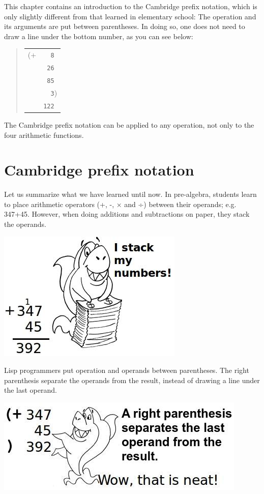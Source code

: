\documentclass[a4paper,12pt]{book}
\begin{document}
This chapter contains an introduction to
the Cambridge prefix notation, 
which is only slightly different from that
learned in elementary school: The operation
and its arguments are put between parentheses.
In doing so, one does not need to draw a line
under the bottom number, as you can see below:
\begin{quote}
\begin{tabular}{p{0.5cm}p{1cm}}
(+ &\verb|  8|\\
&\verb| 26|\\
&\verb| 85|\\
&\verb|  3|)\\
&\verb|122|
\end{tabular}
\end{quote}
The Cambridge prefix notation can be applied
to any operation, not only to the four arithmetic
functions. 

\section{Cambridge prefix notation}
Let us summarize what we have learned
until now. In pre-algebra, students
learn to place arithmetic operators (+, -, × and ÷)
between their operands; e.g. 347+45.
However, when doing additions and subtractions
on paper, they stack the operands.

\includegraphics{figs-prefix/stackshark.jpg}


Lisp programmers put operation and operands
between parentheses. The right parenthesis
separate the operands from the result,
instead of drawing a line under the last operand.

\includegraphics{figs-prefix/neatsum.jpg}
\end{document}
